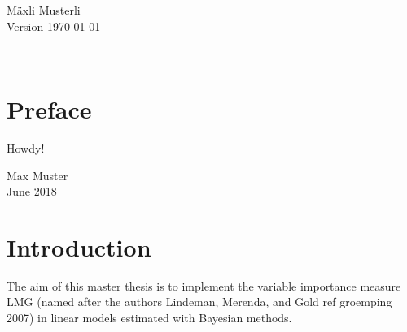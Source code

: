 \documentclass[11pt,a4paper,twoside]{book}\usepackage[]{graphicx}\usepackage[]{color}
\begin{document}


\graphicspath{{./figure/}}
\setcounter{tocdepth}{1}

\thispagestyle{empty}
\begin{center}
\vspace*{6cm}{\bfseries\Huge
  $p$-values:\\[5mm] their use, abuse and proper use \\[5mm]
  illustrated with seven facets 
}
\vfill
\rm

\LARGE
M\"axli Musterli\\[12mm]

\normalsize
Version \today
\end{center}
\newpage
\thispagestyle{empty}~
\newpage
{}

\thispagestyle{plain}
\tableofcontents
{}

\chapter*{Preface}
\thispagestyle{plain}

Howdy!

\bigskip

\begin{flushright}
Max Muster\\
June 2018
\end{flushright}


\cleardoublepage
{}












\chapter{Introduction}

The aim of this master thesis is to implement the variable importance measure LMG (named after the authors Lindeman, Merenda, and Gold ref groemping 2007) in linear models estimated with Bayesian methods. 
\end{document}
